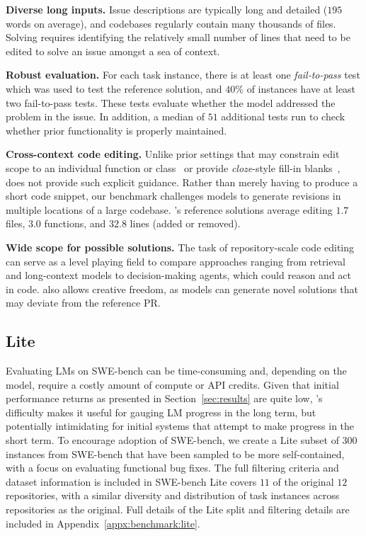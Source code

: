 \textbf{Diverse long inputs.}
Issue descriptions are typically long and detailed ($195$ words on average), and codebases regularly contain many thousands of files.
Solving \benchmark{} requires identifying the relatively small number of lines that need to be edited to solve an issue amongst a sea of context.

\textbf{Robust evaluation.}
For each task instance, there is at least one \textit{fail-to-pass} test which was used to test the reference solution, and $40\%$ of instances have at least two fail-to-pass tests.
These tests evaluate whether the model addressed the problem in the issue.
In addition, a median of $51$ additional tests run to check whether prior functionality is properly maintained.

\textbf{Cross-context code editing.}
Unlike prior settings that may constrain edit scope to an individual function or class~\citep[e.g.,][]{chen2021evaluating, cassano2022multiple} or provide \textit{cloze}-style fill-in blanks~\citep[e.g.,][]{lu2021codexglue,fried2023incoder}, \benchmark{} does not provide such explicit guidance.
Rather than merely having to produce a short code snippet, 
our benchmark challenges models to generate revisions in multiple locations of a large codebase.
\benchmark{}'s reference solutions average editing $1.7$ files, $3.0$ functions, and $32.8$ lines (added or removed).

\textbf{Wide scope for possible solutions.}
The task of repository-scale code editing can serve as a level playing field to compare approaches ranging from retrieval and long-context models to decision-making agents, which could reason and act in code.
\benchmark{} also allows creative freedom, as models can generate novel solutions that may deviate from the reference PR.



\subsection{\benchmark{} Lite}
Evaluating LMs on SWE-bench can be time-consuming and, depending on the model, require a costly amount of compute or API credits.
Given that initial performance returns as presented in Section~\ref{sec:results} are quite low, \benchmark{}'s difficulty makes it useful for gauging LM progress in the long term, but potentially intimidating for initial systems that attempt to make progress in the short term.
To encourage adoption of SWE-bench, we create a Lite subset of $300$ instances from SWE-bench that have been sampled to be more self-contained, with a focus on evaluating functional bug fixes.
The full filtering criteria and dataset information is included in 
SWE-bench Lite covers $11$ of the original $12$ repositories, with a similar diversity and distribution of task instances across repositories as the original.
Full details of the Lite split and filtering details are included in Appendix~\ref{appx:benchmark:lite}.